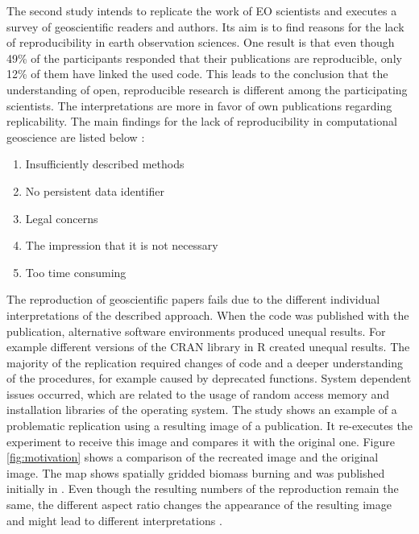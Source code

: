 \documentclass[draft,final]{vutinfth} %
\newcommand{\bgoesswein}[1]{{\color{blue}#1}}
\begin{document}
The second study intends to replicate the work of EO scientists and executes a survey of geoscientific readers and authors. Its aim is to find reasons for the lack of reproducibility in earth observation sciences. One result is that even though 49\% of the participants responded that their publications are reproducible, only 12\% of them have linked the used code. This leads to the conclusion that the understanding of open, reproducible research is different among the participating scientists. The interpretations are more in favor of own publications regarding replicability. The main findings for the lack of reproducibility in computational geoscience are listed below \cite{Thestateofreproducibility}:  

\begin{enumerate}
	\item Insufficiently described methods 
	\item No persistent data identifier
	\item Legal concerns
	\item The impression that it is not necessary
	\item Too \bgoesswein{t}ime consuming
\end{enumerate} 

The reproduction of geoscientific papers fails due to the different individual interpretations of the described approach. When the code was published with the publication, alternative software environments produced unequal results. For example different versions of the CRAN library in R created unequal results. The majority of the replication required changes of code and a deeper understanding of the procedures, for example caused by deprecated functions. System dependent issues occurred, which are related to the usage of random access memory and installation libraries of the operating system. 
The study shows an example of a problematic replication using a resulting image of a publication.
It re-executes the experiment to receive this image and compares it with the original one. Figure \ref{fig:motivation} shows a comparison of the recreated image and the original image. The map shows spatially gridded biomass burning and was published initially in \cite{bg-13-3225-2016}. Even though the resulting numbers of the reproduction remain the same, the different aspect ratio changes the appearance of the resulting image and might lead to different interpretations \cite{Thestateofreproducibility}.
\end{document}
